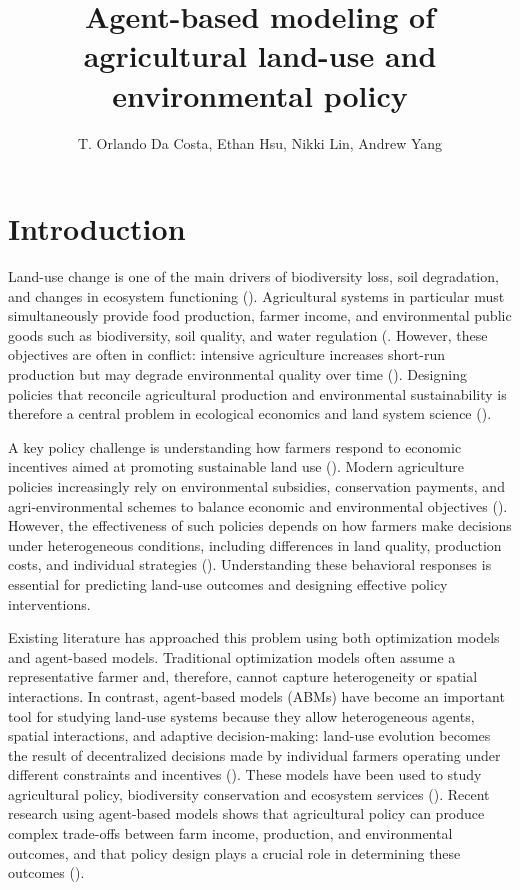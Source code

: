 \documentclass{article}
\title{Agent-based modeling of agricultural land-use and environmental policy}
\author{T. Orlando Da Costa, Ethan Hsu, Nikki Lin, Andrew Yang}
\begin{document}
\maketitle

\section{Introduction}

Land-use change is one of the main drivers of biodiversity loss, soil degradation, and changes in ecosystem functioning (\cite{yin2020soil,foley2005consequence, tilman2011nature}). Agricultural systems in particular must simultaneously provide food production, farmer income, and environmental public goods such as biodiversity, soil quality, and water regulation (\cite{power2010ecosystem}. However, these objectives are often in conflict: intensive agriculture increases short-run production but may degrade environmental quality over time (\cite{tanentzap2015conflict,tilman2002nature, foley2005consequence}). Designing policies that reconcile agricultural production and environmental sustainability is therefore a central problem in ecological economics and land system science (\cite{lambin2011global}).

A key policy challenge is understanding how farmers respond to economic incentives aimed at promoting sustainable land use (\cite{tanentzap2015conflict}). Modern agriculture policies increasingly rely on environmental subsidies, conservation payments, and agri-environmental schemes to balance economic and environmental objectives (\cite{pannell2008public}). However, the effectiveness of such policies depends on how farmers make decisions under heterogeneous conditions, including differences in land quality, production costs, and individual strategies (\cite{pannell2006landholders}). Understanding these behavioral responses is essential for predicting land-use outcomes and designing effective policy interventions. 

Existing literature has approached this problem using both optimization models and agent-based models. Traditional optimization models often assume a representative farmer and, therefore, cannot capture heterogeneity or spatial interactions. In contrast, agent-based models (ABMs) have become an important tool for studying land-use systems because they allow heterogeneous agents, spatial interactions, and adaptive decision-making: land-use evolution becomes the result of decentralized decisions made by individual farmers operating under different constraints and incentives (\cite{matthews2007abm, dai2020landsystem}). These models have been used to study agricultural policy, biodiversity conservation and ecosystem services (\cite{brady2012abm}). Recent research using agent-based models shows that agricultural policy can produce complex trade-offs between farm income, production, and environmental outcomes, and that policy design plays a crucial role in determining these outcomes (\cite{coronese2023agrilove, bayram2024luxembourg, baldi2025cap}). 
\end{document}
